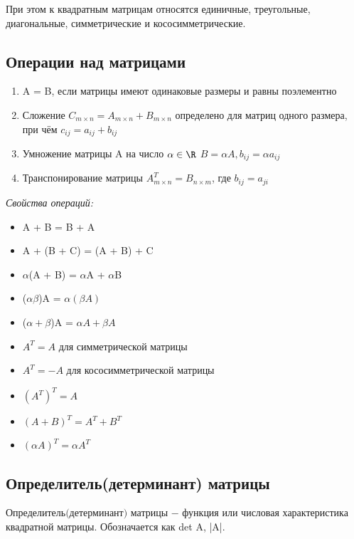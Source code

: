 При этом к квадратным матрицам относятся единичные, треугольные, диагональные, симметрические и кососимметрические.



\subsection{Операции над матрицами}

\begin{enumerate}
	\item A = B, если матрицы имеют одинаковые размеры и равны поэлементно
	\item Сложение $C_{m \times n} = A_{m \times n} + B_{m \times n}$ определено для матриц одного размера, при чём $c_{ij} = a_{ij} + b_{ij}$
	\item Умножение матрицы A на число $\alpha \in \R$ $B = \alpha A, b_{ij} = \alpha a_{ij}$
	\item Транспонирование матрицы $A_{m \times n}^T = B_{n \times m}$, где $b_{ij} = a_{ji}$
	
\end{enumerate}

\textit{Свойства операций:}
\begin{itemize}
	\item A + B = B + A
	\item A + (B + C) = (A + B) + C
	\item $\alpha$(A + B) = $\alpha$A + $\alpha$B
	\item ($\alpha\beta$)A = $\alpha(\beta A)$
	\item ($\alpha + \beta$)A = $\alpha A + \beta A$
	\item $A^T = A$ для симметрической матрицы
	\item $A^T = -A$ для кососимметрической матрицы
	\item $(A^T)^T = A$
	\item $(A + B)^T = A^T + B^T$
	\item $(\alpha A)^T = \alpha A^T$
\end{itemize}


\subsection{Определитель(детерминант) матрицы}

\begin{definition}
	$\textit{Определитель(детерминант) матрицы}$ $-$ функция или числовая характеристика квадратной матрицы. Обозначается как det A, |A|.
\end{definition}
	
